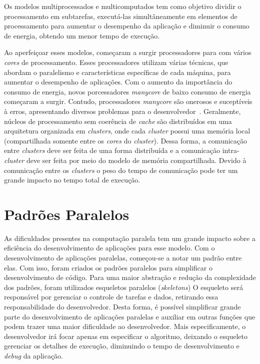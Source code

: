 
Os modelos multiprocessados e multicomputados tem como objetivo dividir o
processamento em subtarefas, executá-las simultâneamente em elementos de
processamento para aumentar o desempenho da aplicação e diminuir o consumo de
energia, obtendo um menor tempo de execução.


Ao aperfeiçoar esses modelos, começaram a surgir processadores para \hpc com
vários \textit{cores} de processamento. Esses processadores utilizam várias
técnicas, que abordam o paralelismo e características específicas de cada
máquina, para aumentar o desempenho de aplicações. Com o aumento da importância
do consumo de energia, novos porcessadores \textit{manycore} de baixo consumo de
energia começaram a surgir. Contudo, processadores \textit{manycore} são
onerosos e suceptíveis à erros, apresentando diversos problemas para o
desenvolvedor~\cite{pereira15}. Geralmente, núcleos de processamento sem
coerência de \textit{cache} são distribuídos em uma arquitetura organizada em
\textit{clusters}, onde cada \textit{cluster} possui uma memória local
(compartilhada somente entre os \textit{cores} do \textit{cluster}). Dessa
forma, a comunicação entre \textit{clusters} deve ser feita de uma forma
distribuída e a comunicação intra-\textit{cluster} deve ser feita por meio do
modelo de memória compartilhada. Devido à comunicação entre os \textit{clusters}
o peso do tempo de comunicação pode ter um grande impacto no tempo total de
execução.

\section{Padrões Paralelos}
As dificuldades presentes na computação paralela tem um grande impacto sobre a
eficiência do desenvolvimento de aplicações para esse modelo. Com o
desenvolvimento de aplicações paralelas, começou-se a notar um padrão entre
elas. Com isso, foram criados os padrões paralelos para simplificar o
desenvolvimento de código.
Para uma maior abstração e redução da complexidade dos padrões, foram utilizados
esqueletos paralelos (\textit{skeletons}) O esqueleto será responsável por
gerenciar o controle de tarefas e dados, retirando essa responsabilidade do
desenvolvedor. Desta forma, é possível simplificar grande parte do
desenvolvimento de aplicações paralelas e auxiliar em outras funções que podem
trazer uma maior dificuldade ao desenvolvedor. Mais especificamente, o
desenvolvedor irá focar apenas em especificar o algoritmo, deixando o esqueleto
gerenciar os detalhes de execução, diminuindo o tempo de desenvolvimento e
\textit{debug} da aplicação.

